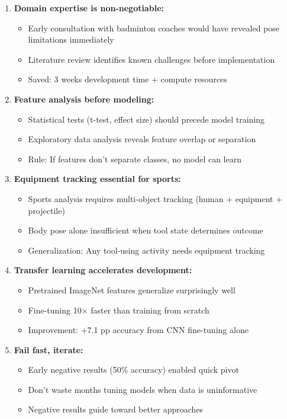 \documentclass[11pt,a4paper]{article}
\begin{document}
\begin{enumerate}
\item \textbf{Domain expertise is non-negotiable:}
   \begin{itemize}
   \item Early consultation with badminton coaches would have revealed pose limitations immediately
   \item Literature review identifies known challenges before implementation
   \item Saved: 3 weeks development time + compute resources
   \end{itemize}

\item \textbf{Feature analysis before modeling:}
   \begin{itemize}
   \item Statistical tests (t-test, effect size) should precede model training
   \item Exploratory data analysis reveals feature overlap or separation
   \item Rule: If features don't separate classes, no model can learn
   \end{itemize}

\item \textbf{Equipment tracking essential for sports:}
   \begin{itemize}
   \item Sports analysis requires multi-object tracking (human + equipment + projectile)
   \item Body pose alone insufficient when tool state determines outcome
   \item Generalization: Any tool-using activity needs equipment tracking
   \end{itemize}

\item \textbf{Transfer learning accelerates development:}
   \begin{itemize}
   \item Pretrained ImageNet features generalize surprisingly well
   \item Fine-tuning 10$\times$ faster than training from scratch
   \item Improvement: +7.1 pp accuracy from CNN fine-tuning alone
   \end{itemize}

\item \textbf{Fail fast, iterate:}
   \begin{itemize}
   \item Early negative results (50\% accuracy) enabled quick pivot
   \item Don't waste months tuning models when data is uninformative
   \item Negative results guide toward better approaches
   \end{itemize}
\end{enumerate}
\end{document}
